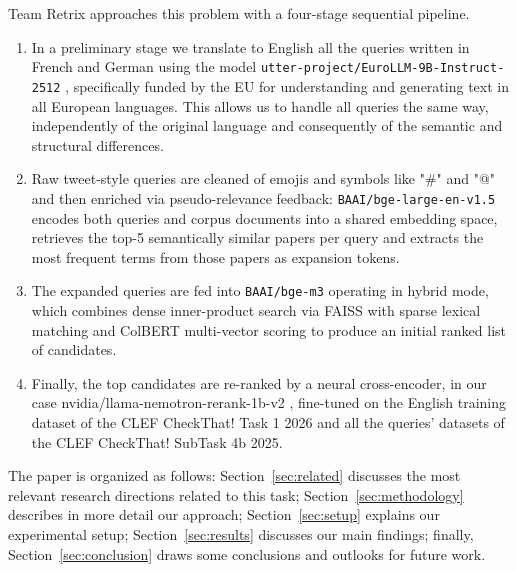 Team Retrix approaches this problem with a four-stage sequential pipeline.
\begin{enumerate}
    \item In a preliminary stage we translate to English all the queries written in French and German using the model \texttt{utter-project/EuroLLM-9B-Instruct-2512} \cite{eurollm-9b-instruct}, specifically funded by the EU for understanding and generating text in all European languages. This allows us to handle all queries the same way, independently of the original language and consequently of the semantic and structural differences.

    \item Raw tweet-style queries are cleaned of emojis and symbols like "\#" and "@" and then enriched via pseudo-relevance feedback: \texttt{BAAI/bge-large-en-v1.5} \cite{bge-large-en-v1.5} encodes both queries and corpus documents into a shared embedding space, retrieves the top-5 semantically similar papers per query and extracts the most frequent terms from those papers as expansion tokens.
    
    \item The expanded queries are fed into \texttt{BAAI/bge-m3} \cite{bge-m3-hf} operating in hybrid mode, which combines dense inner-product search via FAISS \cite{faiss_documentation} with sparse lexical matching and ColBERT multi-vector scoring to produce an initial ranked list of candidates.

    \item Finally, the top candidates are re-ranked by a neural cross-encoder, in our case nvidia/llama-nemotron-rerank-1b-v2 \cite{nvidia_llama_nemotron_rerank_1b_v2_2026}, fine-tuned on the English training dataset of the CLEF CheckThat! Task 1 2026 and all the queries' datasets of the  CLEF CheckThat! SubTask 4b 2025.
\end{enumerate}  

The paper is organized as follows: Section~\ref{sec:related} discusses the most relevant research directions related to this task; Section~\ref{sec:methodology} describes in more detail our approach; Section~\ref{sec:setup} explains our experimental setup; Section~\ref{sec:results} discusses our main findings; finally, Section~\ref{sec:conclusion} draws some conclusions and outlooks for future work.